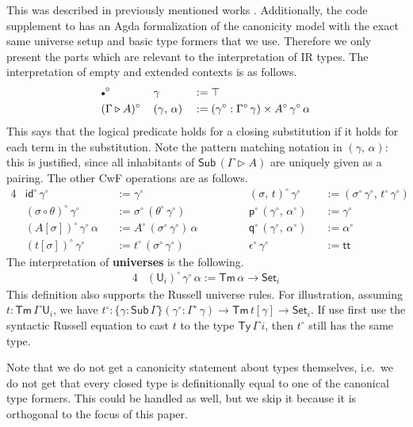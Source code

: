 \documentclass[acmsmall,screen,review]{acmart}
\newcommand{\msf}[1]{{\mathsf{#1}}}
\newcommand{\p}{\mathsf{p}}
\newcommand{\q}{\mathsf{q}}
\newcommand{\U}{\msf{U}}
\newcommand{\Set}{\msf{Set}}
\newcommand{\ttt}{\msf{tt}}
\newcommand{\emptycon}{\scaleobj{.75}\bullet}
\newcommand{\id}{\msf{id}}
\newcommand{\Sub}{\msf{Sub}}
\newcommand{\Ty}{\msf{Ty}}
\newcommand{\Tm}{\msf{Tm}}
\newcommand{\ext}{\triangleright}
\newcommand{\w}{\circ}
\begin{document}
This was described in previously mentioned works \cite{gluing,coquand2018canonicity}. Additionally,
the code supplement \cite{formalisation} to \cite{DBLP:conf/mpc/KaposiKK19} has an Agda
formalization of the canonicity model with the exact same universe setup and basic type formers that
we use. Therefore we only present the parts which are relevant to the interpretation of IR
types. The interpretation of empty and extended contexts is as follows.
\begin{alignat*}{3}
  &\emptycon^\w\,&&\gamma                 &&:= \top \\
  &(\Gamma\ext A)^\w\,&&(\gamma,\,\alpha) &&:= (\gamma^\w : \Gamma^\w\,\gamma) \times A^\w\,\gamma^\w\,\alpha
\end{alignat*}
This says that the logical predicate holds for a closing substitution if it holds for each term in
the substitution. Note the pattern matching notation in $(\gamma,\,\alpha)$: this is justified,
since all inhabitants of $\Sub\,(\Gamma\ext A)$ are uniquely given as a pairing. The other CwF operations
are as follows.
\begin{alignat*}{4}
  &\id^\w\,\gamma^\w                   &&:= \gamma^\w                  &&(\sigma,\,t)^\w\,\gamma^\w          &&:= (\sigma^\w\,\gamma^\w,\,t^\w\,\gamma^\w)\\
  &(\sigma \circ \theta)^\w\,\gamma^\w &&:= \sigma^\w\,(\theta^\w\,\gamma^\w) && \p^\w\,(\gamma^\w,\,\alpha^\w)      &&:= \gamma^\w\\
  &(A[\sigma]) ^\w\,\gamma^\w\,\alpha  &&:= A^\w\,(\sigma^\w\,\gamma^\w)\,\alpha\hspace{3em} && \q^\w\,(\gamma^\w,\,\alpha^\w)      &&:= \alpha^\w\\
  &(t[\sigma]) ^\w\,\gamma^\w          &&:= t^\w\,(\sigma^\w\,\gamma^\w) && \epsilon^\w\,\gamma^\w              &&:= \ttt
\end{alignat*}
The interpretation of \textbf{universes} is the following.
\begin{alignat*}{4}
  &(\U_i)^\w\,\gamma^\w\,\alpha := \Tm\,\alpha \to \Set_i
\end{alignat*}
This definition also supports the Russell universe rules. For illustration, assuming $t :
\Tm\,\Gamma\,\U_i$, we have $t^\w : \{\gamma : \Sub\,\Gamma\}(\gamma^\w : \Gamma^\w\,\gamma) \to
\Tm\,t[\gamma] \to \Set_i$. If use first use the syntactic Russell equation to cast $t$ to the type
$\Ty\,\Gamma\,i$, then $t^\w$ still has the same type.

Note that we do not get a canonicity statement about types themselves, i.e.\ we do not get that
every closed type is definitionally equal to one of the canonical type formers. This could be handled
as well, but we skip it because it is orthogonal to the focus of this paper.
\end{document}
